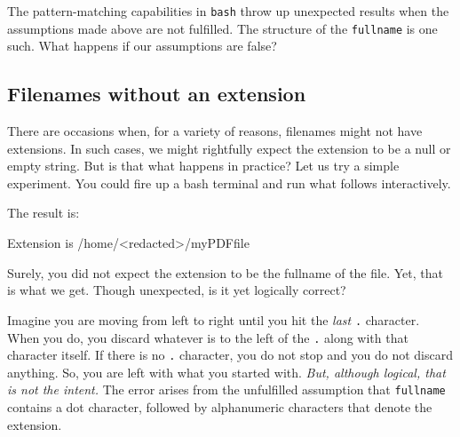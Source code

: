 \documentclass[
  a4paper,
]{article}
\newenvironment{Shaded}{\begin{snugshade}}{\end{snugshade}}
\newcommand{\AttributeTok}[1]{\textcolor[rgb]{0.80,0.80,0.80}{#1}}
\newcommand{\BuiltInTok}[1]{\textcolor[rgb]{0.80,0.80,0.80}{#1}}
\newcommand{\CommentTok}[1]{\textcolor[rgb]{0.50,0.62,0.50}{#1}}
\newcommand{\ExtensionTok}[1]{\textcolor[rgb]{0.80,0.80,0.80}{#1}}
\newcommand{\NormalTok}[1]{\textcolor[rgb]{0.80,0.80,0.80}{#1}}
\newcommand{\OperatorTok}[1]{\textcolor[rgb]{0.94,0.94,0.82}{#1}}
\newcommand{\PreprocessorTok}[1]{\textcolor[rgb]{1.00,0.81,0.69}{\textbf{#1}}}
\newcommand{\StringTok}[1]{\textcolor[rgb]{0.80,0.58,0.58}{#1}}
\newcommand{\VariableTok}[1]{\textcolor[rgb]{0.80,0.80,0.80}{#1}}
\begin{document}
The pattern-matching capabilities in \texttt{bash} throw up unexpected
results when the assumptions made above are not fulfilled. The structure
of the \texttt{fullname} is one such. What happens if our assumptions
are false?

\hypertarget{filenames-without-an-extension}{%
\subsection{Filenames without an
extension}\label{filenames-without-an-extension}}

There are occasions when, for a variety of reasons, filenames might not
have extensions. In such cases, we might rightfully expect the extension
to be a null or empty string. But is that what happens in practice? Let
us try a simple experiment. You could fire up a bash terminal and run
what follows interactively.

\begin{Shaded}
\end{Shaded}

The result is:

\begin{Shaded}
\begin{Highlighting}[]
\ExtensionTok{Extension}\NormalTok{ is /home/}\OperatorTok{\textless{}}\NormalTok{redacted}\OperatorTok{\textgreater{}}\NormalTok{/myPDFfile}
\end{Highlighting}
\end{Shaded}

Surely, you did not expect the extension to be the fullname of the file.
Yet, that is what we get. Though unexpected, is it yet logically
correct?

Imagine you are moving from left to right until you hit the \emph{last}
\texttt{.} character. When you do, you discard whatever is to the left
of the \texttt{.} along with that character itself. If there is no
\texttt{.} character, you do not stop and you do not discard anything.
So, you are left with what you started with. \emph{But, although
logical, that is not the intent.} The error arises from the unfulfilled
assumption that \texttt{fullname} contains a dot character, followed by
alphanumeric characters that denote the extension.
\end{document}
